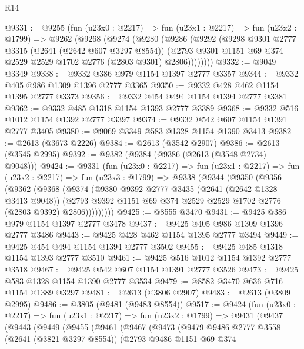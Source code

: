 \begin{lexlean}{R14}
\begin{coremodule}
@9331 := @9255
    (fun (u23x0 : @2217) =>
    fun (u23x1 : @2217) =>
    fun (u23x2 : @1799) =>
    @9262
      (@9268
        (@9274
          (@9280
            (@9286
              (@9292
                (@9298
                  @9301
                  @2777
                  @3315
                  (@2641 (@2642 @607 @3297 @8554))
                  (@2793 @9301 @1151 @69 @374 @2529 @2529 @1702 @2776 (@2803 @9301) @2806))))))))
@9332 := @9049 @3349
@9338 := @9332 @386 @979 @1154 @1397 @2777 @3357
@9344 := @9332 @405 @986 @1309 @1396 @2777 @3365
@9350 := @9332 @428 @462 @1154 @1395 @2777 @3373
@9356 := @9332 @454 @494 @1154 @1394 @2777 @3381
@9362 := @9332 @485 @1318 @1154 @1393 @2777 @3389
@9368 := @9332 @516 @1012 @1154 @1392 @2777 @3397
@9374 := @9332 @542 @607 @1154 @1391 @2777 @3405
@9380 := @9069 @3349 @583 @1328 @1154 @1390 @3413
@9382 := @2613 (@3673 @2226)
@9384 := @2613 (@3542 @2907)
@9386 := @2613 (@3545 @2995)
@9392 := @9382 (@9384 (@9386 (@2613 (@3548 @2734) @9048)))
@9424 := @9331
    (fun (u23x0 : @2217) =>
    fun (u23x1 : @2217) =>
    fun (u23x2 : @2217) =>
    fun (u23x3 : @1799) =>
    @9338
      (@9344
        (@9350
          (@9356
            (@9362
              (@9368
                (@9374
                  (@9380
                    @9392
                    @2777
                    @3435
                    (@2641 (@2642 @1328 @3413 @9048))
                    (@2793 @9392 @1151 @69 @374 @2529 @2529 @1702 @2776 (@2803 @9392) @2806)))))))))
@9425 := @8555 @3470
@9431 := @9425 @386 @979 @1154 @1397 @2777 @3478
@9437 := @9425 @405 @986 @1309 @1396 @2777 @3486
@9443 := @9425 @428 @462 @1154 @1395 @2777 @3494
@9449 := @9425 @454 @494 @1154 @1394 @2777 @3502
@9455 := @9425 @485 @1318 @1154 @1393 @2777 @3510
@9461 := @9425 @516 @1012 @1154 @1392 @2777 @3518
@9467 := @9425 @542 @607 @1154 @1391 @2777 @3526
@9473 := @9425 @583 @1328 @1154 @1390 @2777 @3534
@9479 := @8582 @3470 @636 @716 @1154 @1389 @3297
@9481 := @2613 (@3806 @2907)
@9483 := @2613 (@3809 @2995)
@9486 := @3805 (@9481 (@9483 @8554))
@9517 := @9424
    (fun (u23x0 : @2217) =>
    fun (u23x1 : @2217) =>
    fun (u23x2 : @1799) =>
    @9431
      (@9437
        (@9443
          (@9449
            (@9455
              (@9461
                (@9467
                  (@9473
                    (@9479
                      @9486
                      @2777
                      @3558
                      (@2641 (@3821 @3297 @8554))
                      (@2793
                        @9486
                        @1151
                        @69
                        @374

\end{coremodule}
\end{lexlean}
